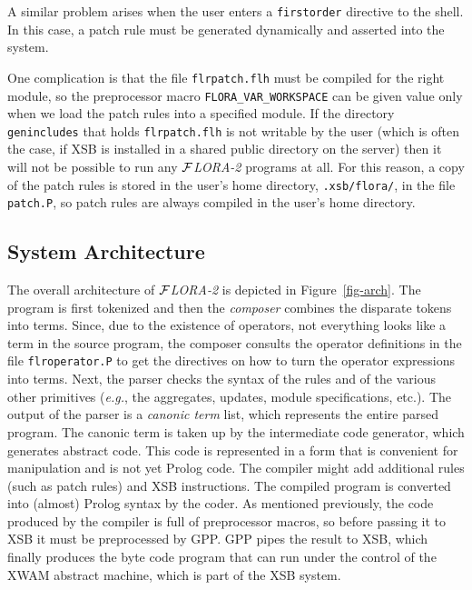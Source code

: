 \documentclass[11pt]{article}
\newcommand{\FLORA}{{\mbox{${\cal F}${\small\it LORA}\rm\emph{-2}}}\xspace}
\begin{document}
A similar problem arises when the user enters a {\tt firstorder} directive
to the shell. In this case, a patch rule must be generated dynamically and
asserted into the system.

One complication is that the file {\tt flrpatch.flh} must be compiled for
the right module, so the preprocessor macro {\tt FLORA\_VAR\_WORKSPACE} can
be given value only when we load the patch rules into a specified module.
If the directory {\tt genincludes} that holds {\tt flrpatch.flh} is not
writable by the user (which is often the case, if XSB is installed in a
shared public directory on the server) then it will not be possible to run
any \FLORA programs at all. For this reason, a copy of the patch rules is
stored in the user's home directory, {\tt .xsb/flora/}, in the file {\tt
  patch.P}, so patch rules are always compiled in the user's home
directory.


\subsection{System Architecture}

The overall architecture of \FLORA is depicted in Figure~\ref{fig-arch}.
The program is first tokenized and then the \emph{composer} combines the
disparate tokens into terms. Since, due to the existence of operators, not
everything looks like a term in the source program, the composer consults
the operator definitions in the file {\tt flroperator.P} to get the
directives on how to turn the operator expressions into terms. Next, the
parser checks the syntax of the rules and of the various other primitives
({\it e.g.}, the aggregates, updates, module specifications, etc.). The
output of the parser is a \emph{canonic term} list, which represents the
entire parsed program. The canonic term is taken up by the intermediate
code generator, which generates abstract code. This code is represented in
a form that is convenient for manipulation and is not yet Prolog code.  The
compiler might add additional rules (such as patch rules) and XSB
instructions. The compiled program is converted into (almost) Prolog syntax
by the coder. As mentioned previously, the code produced by the compiler is
full of preprocessor macros, so before passing it to XSB it must be
preprocessed by GPP. GPP pipes the result to XSB, which finally produces
the byte code program that can run under the control of the XWAM abstract
machine, which is part of the XSB system.
\end{document}
